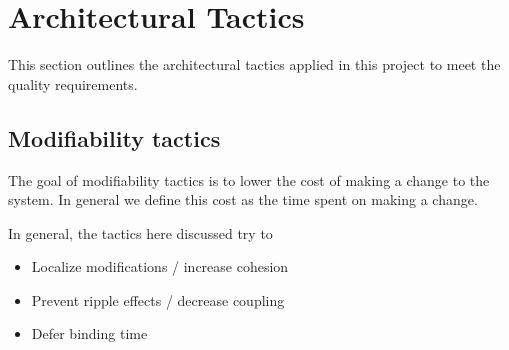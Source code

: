 \section{Architectural Tactics}
This section outlines the architectural tactics applied in this project to meet the quality requirements.

	\subsection{Modifiability tactics}
	The goal of modifiability tactics is to lower the cost of making a change to the system. In general we define this cost as the time spent on making a change.
	
	In general, the tactics here discussed try to
	\begin{itemize}  
		\item Localize modifications / increase cohesion
		\item Prevent ripple effects / decrease coupling
		\item Defer binding time
	\end{itemize}
	

